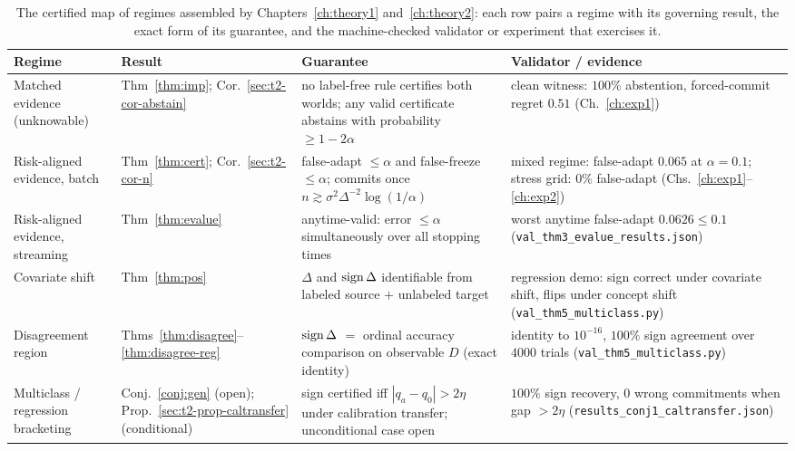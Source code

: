 \begin{table}[t]\centering\small
\begin{tabular}{p{}p{}p{}p{}}
\toprule
Regime & Result & Guarantee & Validator / evidence \\
\midrule
Matched evidence (unknowable) & Thm~\ref{thm:imp}; Cor.~\ref{sec:t2-cor-abstain} &
no label-free rule certifies both worlds; any valid certificate abstains with
probability $\ge1-2\alpha$ &
clean witness: $100\%$ abstention, forced-commit regret $0.51$
(Ch.~\ref{ch:exp1}) \\
\addlinespace
Risk-aligned evidence, batch & Thm~\ref{thm:cert}; Cor.~\ref{sec:t2-cor-n} &
false-adapt $\le\alpha$ and false-freeze $\le\alpha$; commits once
$n\gtrsim\sigma^2\Delta^{-2}\log(1/\alpha)$ &
mixed regime: false-adapt $0.065$ at $\alpha=0.1$; stress grid: $0\%$ false-adapt
(Chs.~\ref{ch:exp1}--\ref{ch:exp2}) \\
\addlinespace
Risk-aligned evidence, streaming & Thm~\ref{thm:evalue} &
anytime-valid: error $\le\alpha$ simultaneously over all stopping times &
worst anytime false-adapt $0.0626\le0.1$
(\texttt{val\_thm3\_evalue\_results.json}) \\
\addlinespace
Covariate shift & Thm~\ref{thm:pos} &
$\Delta$ and $\operatorname{sign}\Delta$ identifiable from labeled source $+$ unlabeled target &
regression demo: sign correct under covariate shift, flips under concept shift
(\texttt{val\_thm5\_multiclass.py}) \\
\addlinespace
Disagreement region & Thms~\ref{thm:disagree}--\ref{thm:disagree-reg} &
$\operatorname{sign}\Delta$ $=$ ordinal accuracy comparison on observable $D$ (exact identity) &
identity to $10^{-16}$, $100\%$ sign agreement over $4000$ trials
(\texttt{val\_thm5\_multiclass.py}) \\
\addlinespace
Multiclass / regression bracketing & Conj.~\ref{conj:gen} (open);
Prop.~\ref{sec:t2-prop-caltransfer} (conditional) &
sign certified iff $|q_a-q_0|>2\eta$ under calibration transfer; unconditional case
open &
$100\%$ sign recovery, $0$ wrong commitments when gap $>2\eta$
(\texttt{results\_conj1\_caltransfer.json}) \\
\bottomrule
\end{tabular}
\caption{The certified map of regimes assembled by Chapters~\ref{ch:theory1}
and~\ref{ch:theory2}: each row pairs a regime with its governing result, the exact form
of its guarantee, and the machine-checked validator or experiment that exercises it.}
\label{sec:t2-tab-map}
\end{table}


